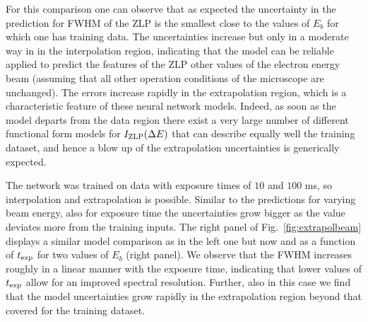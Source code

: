 For this comparison one can observe that as expected the uncertainty in the  prediction for FWHM
of the ZLP is the smallest close to the values of $E_b$ for which one has training data.
%
The uncertainties increase but only in a moderate way in in the interpolation region, indicating that
the model can be reliable applied to predict the features of the ZLP other values of the electron
energy beam (assuming that all other operation conditions of the microscope are unchanged).
%
The errors increase rapidly in the extrapolation region, which is a characteristic feature of
these neural network models.
%
Indeed, as soon as the model departs from the data region there exist a very large
number of different functional form models for $I_{\rm ZLP}(\Delta E)$ that can describe equally well
the training dataset, and hence a blow up of the extrapolation uncertainties is generically expected.

The network was trained on data with exposure times of $10$ and $100$ ms,
so interpolation and extrapolation is possible. Similar to the predictions for varying beam energy, also for exposure time the uncertainties grow bigger as the value deviates more from the training inputs.
%
The right panel of Fig.~\ref{fig:extrapolbeam} displays a similar model
comparison as in the left one but now and as a function of $t_{\rm exp}$ for two values of $E_b$ (right panel).
%
We observe that the FWHM increases roughly in a linear manner with the exposure time, indicating
that lower values of $t_{\rm exp}$ allow for an improved spectral resolution.
%
Further, also in this case we find that the model uncertainties grow rapidly in the
extrapolation region beyond that covered for the training dataset.


